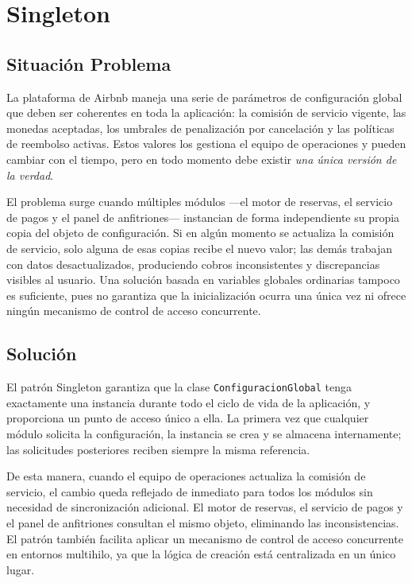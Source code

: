 
\chapter{Singleton}

\section{Situación Problema}

La plataforma de Airbnb maneja una serie de parámetros de configuración
global que deben ser coherentes en toda la aplicación: la comisión de
servicio vigente, las monedas aceptadas, los umbrales de penalización por
cancelación y las políticas de reembolso activas. Estos valores los
gestiona el equipo de operaciones y pueden cambiar con el tiempo, pero en
todo momento debe existir \emph{una única versión de la verdad}.

El problema surge cuando múltiples módulos —el motor de reservas, el
servicio de pagos y el panel de anfitriones— instancian de forma
independiente su propia copia del objeto de configuración. Si en algún
momento se actualiza la comisión de servicio, solo alguna de esas copias
recibe el nuevo valor; las demás trabajan con datos desactualizados,
produciendo cobros inconsistentes y discrepancias visibles al usuario.
Una solución basada en variables globales ordinarias tampoco es suficiente,
pues no garantiza que la inicialización ocurra una única vez ni ofrece
ningún mecanismo de control de acceso concurrente.

\section{Solución}

El patrón Singleton garantiza que la clase \texttt{ConfiguracionGlobal}
tenga exactamente una instancia durante todo el ciclo de vida de la
aplicación, y proporciona un punto de acceso único a ella. La primera
vez que cualquier módulo solicita la configuración, la instancia se crea
y se almacena internamente; las solicitudes posteriores reciben siempre
la misma referencia.

De esta manera, cuando el equipo de operaciones actualiza la comisión de
servicio, el cambio queda reflejado de inmediato para todos los módulos
sin necesidad de sincronización adicional. El motor de reservas, el
servicio de pagos y el panel de anfitriones consultan el mismo objeto,
eliminando las inconsistencias. El patrón también facilita aplicar un
mecanismo de control de acceso concurrente en entornos multihilo, ya que
la lógica de creación está centralizada en un único lugar.

